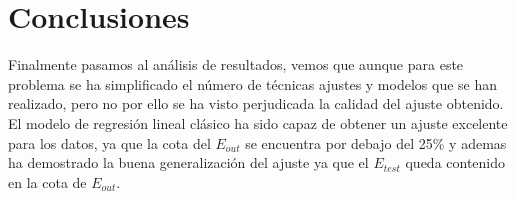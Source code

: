 \section{Conclusiones}
Finalmente pasamos al análisis de resultados, vemos que aunque para este problema se ha simplificado el número de técnicas ajustes y modelos que se han realizado, pero no por ello se ha visto perjudicada la calidad del ajuste obtenido.\\
El modelo de regresión lineal clásico ha sido capaz de obtener un ajuste excelente para los datos, ya que la cota del $E_{out}$ se encuentra por debajo del 25\% y ademas ha demostrado la buena generalización del ajuste ya que el $E_{test}$ queda contenido en la cota de $E_{out}$.
